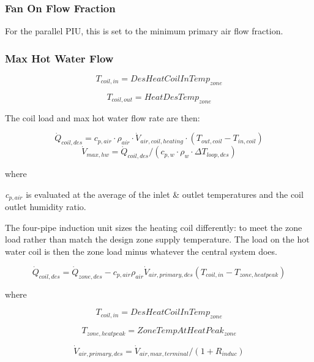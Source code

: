 \subsubsection{Fan On Flow Fraction}\label{fan-on-flow-fraction}

For the parallel PIU, this is set to the minimum primary air flow fraction.

\subsubsection{Max Hot Water Flow}\label{max-hot-water-flow}

\begin{equation}
{T_{coil,in}} = DesHeatCoilInTem{p_{zone}}
\end{equation}

\begin{equation}
{T_{coil,out}} = HeatDesTem{p_{zone}}
\end{equation}

The coil load and max hot water flow rate are then:

\[\dot Q_{coil,des} = c_{p,air}\cdot \rho_{air}\cdot \dot V_{air,coil,heating}\cdot (T_{out,coil} - T_{in,coil})\] \[\dot V_{max,hw} = \dot Q_{coil,des}/(c_{p,w}\cdot \rho_{w}\cdot \Delta T_{loop,des})\]

where

\emph{c\(_{p,air}\)} is evaluated at the average of the inlet \& outlet temperatures and the coil outlet humidity ratio.

The four-pipe induction unit sizes the heating coil differently: to meet the zone load rather than match the design zone supply temperature. The load on the hot water coil is then the zone load minus whatever the central system does.

\begin{equation}
{\dot Q_{coil,des}} = {\dot Q_{zone,des}} - {c_{p,air}}{\rho_{air}}{\dot V_{air,primary,des}}({T_{coil,in}} - {T_{zone,heatpeak}})
\end{equation}

where

\begin{equation}
{T_{coil,in}} = DesHeatCoilInTem{p_{zone}}
\end{equation}

\begin{equation}
{T_{zone,heatpeak}} = ZoneTempAtHeatPea{k_{zone}}
\end{equation}

\begin{equation}
{\dot V_{air,primary,des}} = {\dot V_{air,max,terminal}}/(1 + {R_{induc}})
\end{equation}

